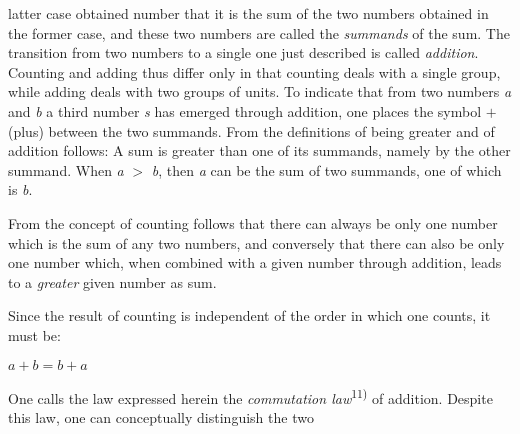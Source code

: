 \thispagestyle{fancy}

\vspace{0.5cm}

latter case obtained number that it is the sum of the two numbers obtained in the former case, and these two numbers are called the \textit{summands} of the sum. The transition from two numbers to a single one just described is called \textit{addition}. Counting and adding thus differ only in that counting deals with a single group, while adding deals with two groups of units. To indicate that from two numbers \textit{a} and \textit{b} a third number \textit{s} has emerged through addition, one places the symbol $+$ (plus) between the two summands. From the definitions of being greater and of addition follows: A sum is greater than one of its summands, namely by the other summand. When \textit{a} $>$ \textit{b}, then \textit{a} can be the sum of two summands, one of which is \textit{b}.

From the concept of counting follows that there can always be only one number which is the sum of any two numbers, and conversely that there can also be only one number which, when combined with a given number through addition, leads to a \textit{greater} given number as sum.

Since the result of counting is independent of the order in which one counts, it must be:

\begin{center}
$a + b = b + a$
\end{center}

One calls the law expressed herein the \textit{commutation law}\textsuperscript{11)} of addition. Despite \hfill this \hfill law, \hfill one \hfill can \hfill conceptually \hfill distinguish \hfill the \hfill two

